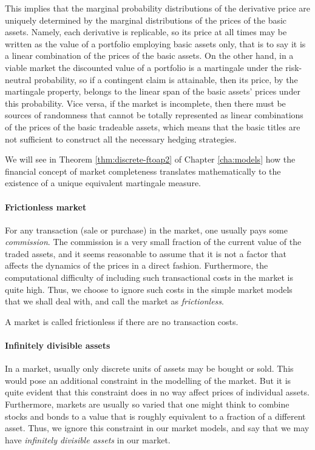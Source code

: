 This implies that the marginal probability distributions of the derivative price are uniquely determined by the marginal distributions of the prices of the basic assets. Namely, each derivative is replicable, so its price at all times may be written as the value of a portfolio employing basic assets only, that is to say it is a linear combination of the prices of the basic assets. On the other hand, in a viable market the discounted value of a portfolio is a martingale under the risk-neutral probability, so if a contingent claim is attainable, then its price, by the martingale property, belongs to the linear span of the basic assets' prices under this probability. Vice versa, if the market is incomplete, then there must be sources of randomness that cannot be totally represented as linear combinations of the prices of the basic tradeable assets, which means that the basic titles are not sufficient to construct all the necessary hedging strategies.

We will see in Theorem \ref{thm:discrete-ftoap2} of Chapter \ref{cha:models} how the financial concept of market completeness translates mathematically to the existence of a unique equivalent martingale measure.


\paragraph{Frictionless market}
For any transaction (sale or purchase) in the market, one usually pays some \emph{commission}. The commission is a very small fraction of the current value of the traded assets, and it seems reasonable to assume that it is not a factor that affects the dynamics of the prices in a direct fashion. Furthermore, the computational difficulty of including such transactional costs in the market is quite high. Thus, we choose to ignore such costs in the simple market models that we shall deal with, and call the market as \emph{frictionless}.

\begin{dfn}
	A market is called frictionless if there are no transaction costs.
\end{dfn}


\paragraph{Infinitely divisible assets}
In a market, usually only discrete units of assets may be bought or sold. This would pose an additional constraint in the modelling of the market. But it is quite evident that this constraint does in no way affect prices of individual assets. Furthermore, markets are usually so varied that one might think to combine stocks and bonds to a value that is roughly equivalent to a fraction of a different asset. Thus, we ignore this constraint in our market models, and say that we may have \emph{infinitely divisible assets} in our market.


